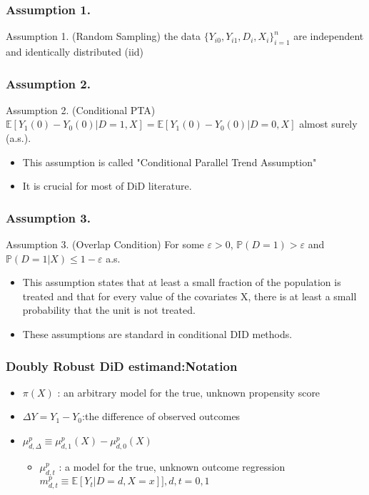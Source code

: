 \documentclass{beamer}
\begin{document}
\begin{frame}\frametitle{Assumption 1.}
    \begin{block}{Assumption 1. (Random Sampling)}
        the data $\{Y_{i0}, Y_{i1}, D_{i}, X_{i}\}^{n}_{i = 1}$ are independent and identically distributed (iid)
    \end{block}
\end{frame}

\begin{frame}\frametitle{Assumption 2.}
    \begin{block}{Assumption 2. (Conditional PTA)}
        $\mathbb{E}[Y_{1}(0) - Y_{0}(0)| D = 1, X] = \mathbb{E}[Y_{1}(0) - Y_{0}(0)|D = 0, X]$ almost surely (a.s.).
    \end{block}
    \begin{itemize}
        \item This assumption is called "Conditional Parallel Trend Assumption"
        \item It is crucial for most of DiD literature.
    \end{itemize}
\end{frame}

\begin{frame}\frametitle{Assumption 3.}
    \begin{block}{Assumption 3. (Overlap Condition)}
        For some $\varepsilon > 0$, $\mathbb{P}(D = 1) > \varepsilon$ and $\mathbb{P}(D = 1|X) \leq 1 - \varepsilon$ a.s.
    \end{block}
    \begin{itemize}
        \item This assumption states that at least a small fraction of the population is treated and that for every value of the covariates X, there is at least a small probability that the unit is not treated.
        \item These assumptions are standard in conditional DID methods.
    \end{itemize}
\end{frame}

\begin{frame}\frametitle{Doubly Robust DiD estimand:Notation}
    \begin{itemize}
        \item $\pi(X)$ : an arbitrary model for the true, unknown propensity score
        \item $\Delta Y = Y_{1} - Y_{0}$:the difference of observed outcomes
        \item $\mu ^{p}_{d,\Delta} \equiv \mu ^{p}_{d,1}(X) - \mu ^{p}_{d,0}(X)$
        \begin{itemize}
            \item $\mu ^{p}_{d,t}$ : a model for the true, unknown outcome regression $m^{p}_{d,t} \equiv \mathbb{E}[Y_{t}|D = d, X = x]],d,t = 0,1$
        \end{itemize}
    \end{itemize}
\end{frame}
\end{document}
